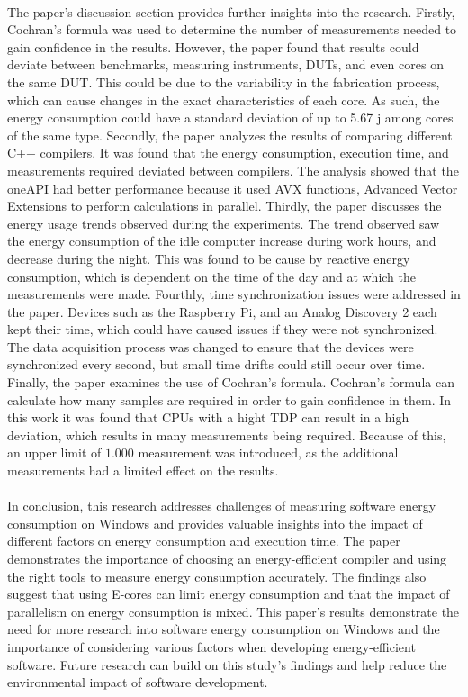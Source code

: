 \paragraph*{}
The paper's discussion section provides further insights into the research. Firstly, Cochran's formula was used to determine the number of measurements needed to gain confidence in the results. However, the paper found that results could deviate between benchmarks, measuring instruments, DUTs, and even cores on the same DUT. This could be due to the variability in the fabrication process, which can cause changes in the exact characteristics of each core. As such, the energy consumption could have a standard deviation of up to 5.67 j among cores of the same type. Secondly, the paper analyzes the results of comparing different C++ compilers. It was found that the energy consumption, execution time, and measurements required deviated between compilers. The analysis showed that the oneAPI had better performance because it used AVX functions, Advanced Vector Extensions to perform calculations in parallel. Thirdly, the paper discusses the energy usage trends observed during the experiments. The trend observed saw the energy consumption of the idle computer increase during work hours, and decrease during the night. This was found to be cause by reactive energy consumption, which is dependent on the time of the day and at which the measurements were made. Fourthly, time synchronization issues were addressed in the paper. Devices such as the Raspberry Pi, and an Analog Discovery 2 each kept their time, which could have caused issues if they were not synchronized. The data acquisition process was changed to ensure that the devices were synchronized every second, but small time drifts could still occur over time. Finally, the paper examines the use of Cochran's formula. Cochran's formula can calculate how many samples are required in order to gain confidence in them. In this work it was found that CPUs with a hight TDP can result in a high deviation, which results in many measurements being required. Because of this, an upper limit of $1.000$ measurement was introduced, as the additional measurements had a limited effect on the results.

\paragraph*{}
In conclusion, this research addresses challenges of measuring software energy consumption on Windows and provides valuable insights into the impact of different factors on energy consumption and execution time. The paper demonstrates the importance of choosing an energy-efficient compiler and using the right tools to measure energy consumption accurately. The findings also suggest that using E-cores can limit energy consumption and that the impact of parallelism on energy consumption is mixed. This paper's results demonstrate the need for more research into software energy consumption on Windows and the importance of considering various factors when developing energy-efficient software. Future research can build on this study's findings and help reduce the environmental impact of software development. 

